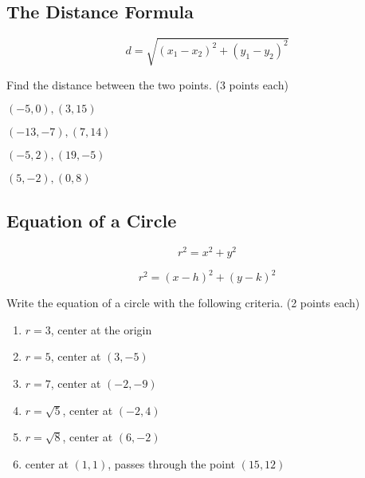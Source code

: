 \documentclass[12pt]{article}
\begin{document}
\hrulefill

\subsection*{The Distance Formula}

$$d=\sqrt{(x_{1}-x_{2})^{2}+(y_{1}-y_{2})^{2}}$$

Find the distance between the two points. (3 points each)\\

\begin{enumerate}[resume]
\begin{multicols}{2}

	
	\item $(-5,0),(3,15)$\\
	
	\item $(-13,-7),(7,14)$\\
	
	\item $(-5,2), (19,-5)$\\
	
	\item $(5,-2),(0,8)$\\

\end{multicols}
\end{enumerate}

\pagebreak

\subsection*{Equation of a Circle}

$$r^2=x^2+y^2$$

$$r^2=(x-h)^2+(y-k)^2$$

Write the equation of a circle with the following criteria. (2 points each)\\

\begin{enumerate}[resume]

	\item $r=3$, center at the origin\\
	
	\item $r=5$, center at $(3,-5)$\\
	
	\item $r=7$, center at $(-2,-9)$\\
	
	\item $r=\sqrt{5}$, center at $(-2,4)$\\
	
	\item $r=\sqrt{8}$, center at $(6,-2)$\\
	
	\item center at $(1,1)$, passes through the point $(15,12)$\\
	
	
\end{enumerate}
\end{document}

